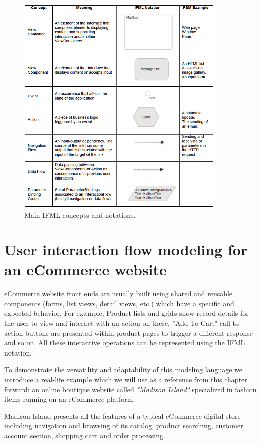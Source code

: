 \vspace{0.5cm}
\begin{figure}[htbp]
  \centering
    \includegraphics[width=10cm]{images/ifml.jpg}
  \caption{Main IFML concepts and notations.}
  \label{fig:ifml}
\end{figure}
\vspace{0.5cm}

\section{User interaction flow modeling for an eCommerce website}

eCommerce website front ends are usually built using shared and reusable components (forms, list views, detail views, etc.) which have a specific and expected behavior.
For example, Product lists and grids show record details for the user to view and interact with an action on these, "Add To Cart" call-to-action buttons are presented within product pages to trigger a different response and so on.
All these interactive operations can be represented using the IFML notation.

To demonstrate the versatility and adaptability of this modeling language we introduce a real-life example which we will use as a reference from this chapter forward: an online boutique website called \textit{"Madison Island"} specialized in fashion items running on an eCommerce platform.

Madison Island presents all the features of a typical eCommerce digital store including navigation and browsing of its catalog, product searching, customer account section, shopping cart and order processing. 


